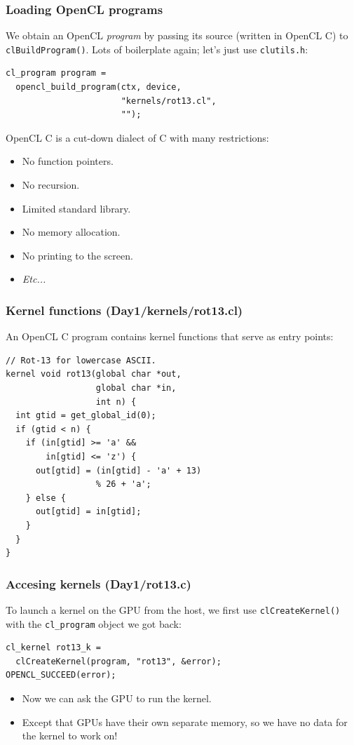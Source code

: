 \documentclass{beamer}
\begin{document}
\begin{frame}[fragile]
  \frametitle{Loading OpenCL programs}

  We obtain an OpenCL \textit{program} by passing its source (written
  in OpenCL C) to \texttt{clBuildProgram()}.  Lots of boilerplate
  again; let's just use \texttt{clutils.h}:

\begin{lstlisting}
cl_program program =
  opencl_build_program(ctx, device,
                       "kernels/rot13.cl",
                       "");
\end{lstlisting}

  OpenCL C is a cut-down dialect of C with many restrictions:

  \begin{itemize}
  \item No function pointers.
  \item No recursion.
  \item Limited standard library.
  \item No memory allocation.
  \item No printing to the screen.
  \item \textit{Etc...}
  \end{itemize}
\end{frame}

\begin{frame}[fragile]
  \frametitle{Kernel functions (Day1/kernels/rot13.cl)}

  An OpenCL C program contains kernel functions that serve as
  entry points:

\begin{lstlisting}
// Rot-13 for lowercase ASCII.
kernel void rot13(global char *out,
                  global char *in,
                  int n) {
  int gtid = get_global_id(0);
  if (gtid < n) {
    if (in[gtid] >= 'a' &&
        in[gtid] <= 'z') {
      out[gtid] = (in[gtid] - 'a' + 13)
                  % 26 + 'a';
    } else {
      out[gtid] = in[gtid];
    }
  }
}
\end{lstlisting}
\end{frame}

\begin{frame}[fragile]
  \frametitle{Accesing kernels (Day1/rot13.c)}

  To launch a kernel on the GPU from the host, we first use
  \texttt{clCreateKernel()} with the \texttt{cl\_program} object we
  got back:

\begin{lstlisting}
cl_kernel rot13_k =
  clCreateKernel(program, "rot13", &error);
OPENCL_SUCCEED(error);
\end{lstlisting}

  \begin{itemize}
  \item Now we can ask the GPU to run the kernel.
  \item Except that GPUs have their own separate memory, so we have no
    data for the kernel to work on!
  \end{itemize}

\end{frame}
\end{document}

